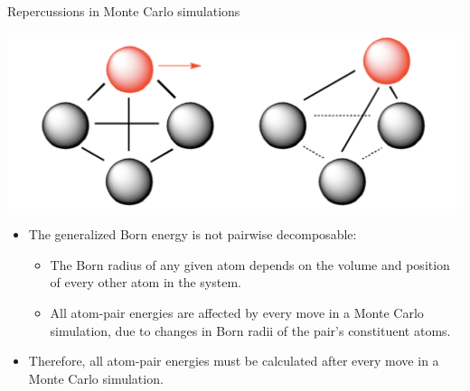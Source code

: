 \documentclass[10pt]{beamer}
\begin{document}
\begin{frame}[t]{Repercussions in Monte Carlo simulations}

\begin{center}
\includegraphics[scale=0.3]{figures/moves.png}
\end{center}

\vspace*{5mm}
\begin{itemize}
    \item The generalized Born energy is not pairwise decomposable:
    \begin{itemize}
    \item The Born radius of any given atom depends on the volume and position of every other atom in the system.
    \item All atom-pair energies are affected by every move in a Monte Carlo simulation, due to changes in Born radii of the pair's constituent atoms.
    \end{itemize}
    \item Therefore, all atom-pair energies must be calculated after every move in a Monte Carlo simulation.
\end{itemize}

\end{frame}

\end{document}
